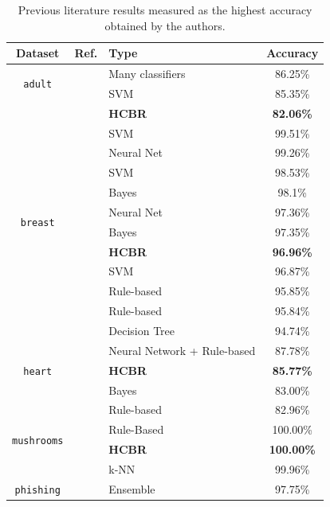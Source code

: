 \documentclass[preprint,12pt]{elsarticle}
\def\bfHCBR{{\sc \bf HCBR}}
\theoremstyle{definition}
\begin{document}
\begin{table}[h!]
\begin{center}
  \caption{Previous literature results measured as the highest accuracy obtained by the authors.}
  \begin{small}
\begin{tabular}{|c|c|l|c|}
\hline
 Dataset & Ref. & Type & Accuracy   \\ \hline
\multirow{2}{*}{\texttt{adult}} & \cite{kou2012evaluation} & Many classifiers &  86.25\% \\
& \cite{Lee2001} & SVM & 85.35\% \\ 
& & \bfHCBR & {\bf 82.06\%} \\ \hline
 \multirow{10}{*}{\texttt{breast}} & \cite{akay2009support}  & SVM & 99.51\% \\ 
 & \cite{MARCANOCEDENO20119573} & Neural Net & 99.26\% \\ 
 & \cite{POLAT2007694} & SVM & 98.53\% \\ 
 & \cite{fallahi2011expert} & Bayes & 98.1\% \\ 
 & \cite{ubeyli2007implementing} & Neural Net & 97.36\% \\ 
 & \cite{Jiang:2012:LIW:2124637.2124641} & Bayes & 97.35\% \\ 
 & & {\bf \bfHCBR} & {\bf 96.96\%} \\
 & \cite{CHEN20119014} & SVM & 96.87\% \\
 & \cite{doi:10.1504/IJBISE.2016.081590} & Rule-based & 95.85\% \\
 & \cite{HADI2017287} & Rule-based & 95.84\% \\
 & \cite{quinlan1996improved} & Decision Tree & 94.74\% \\ \hline
 \multirow{3}{*}{\texttt{heart}} & \cite{sagir2017hybridised} & Neural Network + Rule-based & 87.78\%\\
 & & {\bf \bfHCBR} & {\bf 85.77\%} \\
 & \cite{Jiang:2012:LIW:2124637.2124641} & Bayes & 83.00\% \\ 
 & \cite{doi:10.1504/IJBISE.2016.081590} & Rule-based & 82.96\% \\ \hline
 \multirow{2}{*}{\texttt{mushrooms}} &  \cite{HADI2017287} & Rule-Based & 100.00\% \\ 
  & & {\bf \bfHCBR} & {\bf 100.00\%} \\
  & \cite{Das:2001:FWB:645530.658297} & k-NN & 99.96\% \\ \hline
 \multirow{3}{*}{\texttt{phishing}} & \cite{7881507} & Ensemble & 97.75\% \\ 

\end{tabular}
\end{small}
\end{center}
\end{table}
\end{document}
